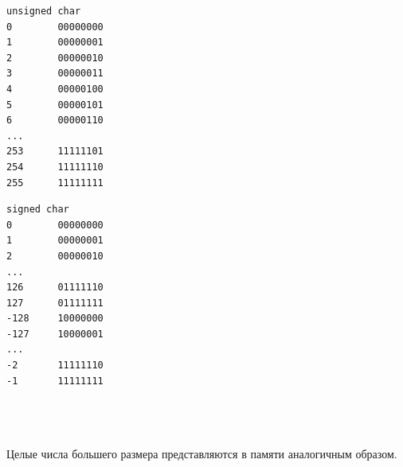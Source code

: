 \documentclass[10pt]{article}
\begin{document}
\begin{minipage}{0.4\textwidth}
\begin{verbatim}
unsigned char
0        00000000
1        00000001
2        00000010
3        00000011
4        00000100
5        00000101
6        00000110
...
253      11111101
254      11111110
255      11111111
\end{verbatim}
\end{minipage}
\begin{minipage}{0.4\textwidth}
\begin{verbatim}
signed char
0        00000000
1        00000001
2        00000010
...
126      01111110
127      01111111
-128     10000000
-127     10000001
...
-2       11111110
-1       11111111
\end{verbatim}
\end{minipage}\\
\quad\\
\quad\\
Целые числа большего размера представляются в памяти аналогичным образом.
\end{document}
